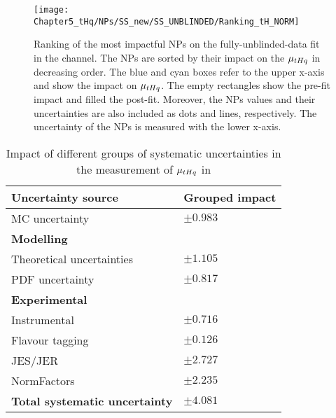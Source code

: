 \begin{figure}[h]%
    \centering
        \texttt{[image: Chapter5\_tHq/NPs/SS\_new/SS\_UNBLINDED/Ranking\_tH\_NORM]}
    \caption{Ranking of the most impactful NPs on the fully-unblinded-data fit in the \dilepSStau channel. 
    The NPs are sorted by their impact on the $\mu_{tHq}$ in decreasing order. 
    The blue and cyan boxes refer to the upper x-axis and show the impact on $\mu_{tHq}$.
    The empty rectangles show the pre-fit impact and filled the post-fit. 
    Moreover, the NPs values and their uncertainties are also included as dots and 
    lines, respectively. The uncertainty of the NPs is measured with the lower x-axis.}
    \label{fig:ChaptH:fitToData:SS:Ranking}
\end{figure}


\begin{table}[h] %
\centering
\begin{tabular}{l|l}
\toprule
\textbf{Uncertainty source}	& Grouped impact	\\
\midrule
MC uncertainty				& $\pm 0.983$		\\
\midrule
\textbf{Modelling}			&            			\\
Theoretical uncertainties			& $\pm 1.105$	\\
PDF uncertainty			& $\pm 0.817$ \\
\midrule
\textbf{Experimental}			&				\\
Instrumental				& $\pm 0.716$	\\
Flavour tagging				& $\pm  0.126$	\\
JES/JER					& $\pm 2.727$	\\
\midrule
NormFactors				& $\pm 2.235$	\\
\midrule
\textbf{Total systematic uncertainty} & $\pm 4.081$\\
\bottomrule   
\end{tabular}
\caption{Impact of different groups of systematic uncertainties in the measurement of $\mu_{tHq}$ in 
}
\end{table}
